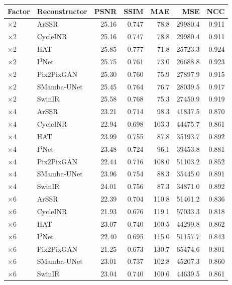 \begin{tabular}{llrrrrr}
\toprule
Factor & Reconstructor & PSNR & SSIM & MAE & MSE & NCC \\
\midrule
$\times$2 & ArSSR & 25.16 & 0.747 & 78.8 & 29980.4 & 0.911 \\
$\times$2 & CycleINR & 25.16 & 0.747 & 78.8 & 29980.4 & 0.911 \\
$\times$2 & HAT & 25.85 & 0.777 & 71.8 & 25723.3 & 0.924 \\
$\times$2 & I$^3$Net & 25.75 & 0.761 & 73.0 & 26688.8 & 0.923 \\
$\times$2 & Pix2PixGAN & 25.30 & 0.760 & 75.9 & 27897.9 & 0.915 \\
$\times$2 & SMamba-UNet & 25.45 & 0.764 & 76.7 & 28039.5 & 0.917 \\
$\times$2 & SwinIR & 25.58 & 0.768 & 75.3 & 27450.9 & 0.919 \\
\addlinespace[2pt]
$\times$4 & ArSSR & 23.21 & 0.714 & 98.3 & 41837.5 & 0.870 \\
$\times$4 & CycleINR & 22.94 & 0.698 & 103.3 & 44475.7 & 0.861 \\
$\times$4 & HAT & 23.99 & 0.755 & 87.8 & 35193.7 & 0.892 \\
$\times$4 & I$^3$Net & 23.48 & 0.724 & 96.1 & 39453.8 & 0.881 \\
$\times$4 & Pix2PixGAN & 22.44 & 0.716 & 108.0 & 51103.2 & 0.852 \\
$\times$4 & SMamba-UNet & 23.96 & 0.754 & 88.3 & 35445.0 & 0.891 \\
$\times$4 & SwinIR & 24.01 & 0.756 & 87.3 & 34871.0 & 0.892 \\
\addlinespace[2pt]
$\times$6 & ArSSR & 22.39 & 0.704 & 110.8 & 51461.2 & 0.836 \\
$\times$6 & CycleINR & 21.93 & 0.676 & 119.1 & 57033.3 & 0.818 \\
$\times$6 & HAT & 23.07 & 0.740 & 100.5 & 44299.8 & 0.862 \\
$\times$6 & I$^3$Net & 22.40 & 0.695 & 115.0 & 51157.7 & 0.843 \\
$\times$6 & Pix2PixGAN & 21.25 & 0.673 & 130.7 & 65474.6 & 0.801 \\
$\times$6 & SMamba-UNet & 23.01 & 0.737 & 102.8 & 45207.3 & 0.860 \\
$\times$6 & SwinIR & 23.04 & 0.740 & 100.6 & 44639.5 & 0.861 \\
\bottomrule
\end{tabular}
